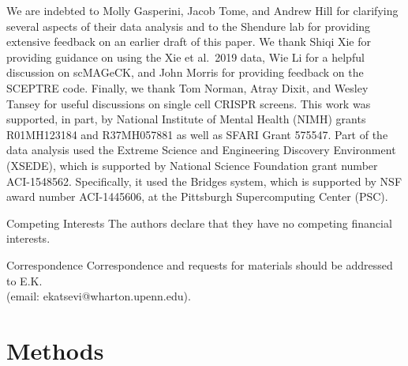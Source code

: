 \documentclass{nature}
\begin{document}
\begin{addendum}
 \item We are indebted to Molly Gasperini, Jacob Tome, and Andrew Hill for clarifying several aspects of their data analysis\cite{Gasperini2019} and to the Shendure lab for providing extensive feedback on an earlier draft of this paper. We thank Shiqi Xie for providing guidance on using the Xie et al.\ 2019 data, Wie Li for a helpful discussion on scMAGeCK, and John Morris for providing feedback on the SCEPTRE code. Finally, we thank Tom Norman, Atray Dixit, and Wesley Tansey for useful discussions on single cell CRISPR screens. This work was supported, in part, by National Institute of Mental Health (NIMH) grants R01MH123184 and R37MH057881 as well as SFARI Grant 575547. Part of the data analysis used the Extreme Science and Engineering Discovery Environment (XSEDE)\cite{XSEDE}, which is supported by National Science Foundation grant number ACI-1548562. Specifically, it used the Bridges system\cite{Bridges}, which is supported by NSF award number ACI-1445606, at the Pittsburgh Supercomputing Center (PSC). \item[Competing Interests] The authors declare that they have no
competing financial interests.
 \item[Correspondence] Correspondence and requests for materials
should be addressed to E.K. \\ (email: ekatsevi@wharton.upenn.edu).
\end{addendum}


\section*{Methods}
\end{document}
